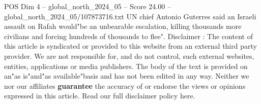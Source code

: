 \begin{textsample}{POS Dim 4 – global\_north\_2024\_05 – Score 24.00 – global\_north\_2024\_05/107873716.txt}
UN chief Antonio Guterres said an Israeli assault on Rafah would"be an unbearable escalation, killing thousands more civilians and forcing hundreds of thousands to flee".
Disclaimer : The content of this article is syndicated or provided to this website from an external third party provider.
We are not responsible for, and do not control, such external websites, entities, applications or media publishers.
The body of the text is provided on an"as is"and"as available"basis and has not been edited in any way.
Neither we nor our affiliates \textbf{guarantee} the accuracy of or endorse the views or opinions expressed in this article.
Read our full disclaimer policy here.

\end{textsample}
